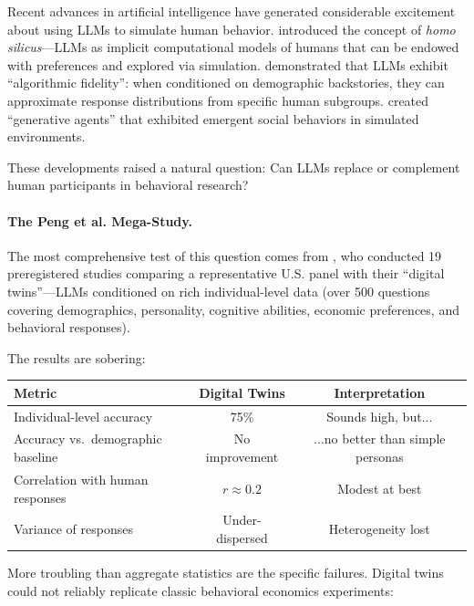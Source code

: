 Recent advances in artificial intelligence have generated considerable
excitement about using LLMs to simulate human behavior. \citet{horton2023}
introduced the concept of \emph{homo silicus}---LLMs as implicit computational
models of humans that can be endowed with preferences and explored via
simulation. \citet{argyle2023} demonstrated that LLMs exhibit ``algorithmic
fidelity'': when conditioned on demographic backstories, they can approximate
response distributions from specific human subgroups. \citet{park2023} created
``generative agents'' that exhibited emergent social behaviors in simulated
environments.

These developments raised a natural question: Can LLMs replace or complement
human participants in behavioral research?

\paragraph{The Peng et al. Mega-Study.}
The most comprehensive test of this question comes from \citet{peng2025}, who
conducted 19 preregistered studies comparing a representative U.S. panel with
their ``digital twins''---LLMs conditioned on rich individual-level data
(over 500 questions covering demographics, personality, cognitive abilities,
economic preferences, and behavioral responses).

The results are sobering:

\begin{center}
\renewcommand{\arraystretch}{1.3}
\begin{tabular}{lcc}
\hline
\textbf{Metric} & \textbf{Digital Twins} & \textbf{Interpretation} \\
\hline
Individual-level accuracy & 75\% & Sounds high, but... \\
Accuracy vs.\ demographic baseline & No improvement & ...no better than simple personas \\
Correlation with human responses & $r \approx 0.2$ & Modest at best \\
Variance of responses & Under-dispersed & Heterogeneity lost \\
\hline
\end{tabular}
\end{center}

More troubling than aggregate statistics are the specific failures. Digital
twins could not reliably replicate classic behavioral economics experiments:

